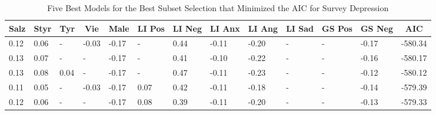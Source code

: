 \documentclass[
  english,
  jou,floatsintext]{apa7}
\begin{document}
\begin{table}[h]

\begin{center}
\begin{threeparttable}

\caption{\label{tab:subset-detail-5}Five Best Models for the Best Subset Selection that Minimized the AIC for Survey Depression}

\small{

\begin{tabular}{lllllllllllll}
\toprule
Salz & \multicolumn{1}{c}{Styr} & \multicolumn{1}{c}{Tyr} & \multicolumn{1}{c}{Vie} & \multicolumn{1}{c}{Male} & \multicolumn{1}{c}{LI Pos} & \multicolumn{1}{c}{LI Neg} & \multicolumn{1}{c}{LI Anx} & \multicolumn{1}{c}{LI Ang} & \multicolumn{1}{c}{LI Sad} & \multicolumn{1}{c}{GS Pos} & \multicolumn{1}{c}{GS Neg} & \multicolumn{1}{c}{AIC}\\
\midrule
0.12 & 0.06 & - & -0.03 & -0.17 & - & 0.44 & -0.11 & -0.20 & - & - & -0.17 & -580.34\\
0.13 & 0.07 & - & - & -0.17 & - & 0.41 & -0.10 & -0.22 & - & - & -0.16 & -580.17\\
0.13 & 0.08 & 0.04 & - & -0.17 & - & 0.47 & -0.11 & -0.23 & - & - & -0.12 & -580.12\\
0.11 & 0.05 & - & -0.03 & -0.17 & 0.07 & 0.42 & -0.11 & -0.18 & - & - & -0.14 & -579.39\\
0.12 & 0.06 & - & - & -0.17 & 0.08 & 0.39 & -0.11 & -0.20 & - & - & -0.13 & -579.33\\
\bottomrule
\end{tabular}

}

\end{threeparttable}
\end{center}

\end{table}
\end{document}
